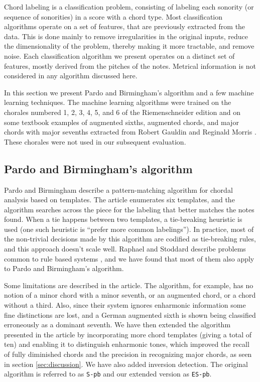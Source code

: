 \documentclass{article}
\begin{document}
Chord labeling is a classification problem, consisting of labeling
each sonority (or sequence of sonorities) in a score with a chord
type. Most classification algorithms operate on a set of features,
that are previously extracted from the data. This is done mainly to
remove irregularities in the original inputs, reduce the
dimensionality of the problem, thereby making it more tractable, and
remove noise. Each classification algorithm we present operates on a
distinct set of features, mostly derived from the pitches of the
notes. Metrical information is not considered in any algorithm
discussed here.

In this section we present Pardo and Birmingham's algorithm and a few
machine learning techniques. The machine learning algorithms were
trained on the chorales numbered 1, 2, 3, 4, 5, and 6 of the
Riemenschneider edition and on some textbook examples of augmented
sixths, augmented chords, and major chords with major sevenths
extracted from Robert Gauldin \cite{gauldin05:harmonic} and Reginald
Morris \cite{morris33:figured}. These chorales were not used in our
subsequent evaluation.

\subsection{Pardo and Birmingham's algorithm}
\label{sec:pardo}


Pardo and Birmingham \cite{barthelemy.ea01:figured} describe a
pattern-matching algorithm for chordal analysis based on templates.
The article enumerates six templates, and the algorithm searches
across the piece for the labeling that better matches the notes found.
When a tie happens between two templates, a tie-breaking heuristic is
used (one such heuristic is ``prefer more common labelings''). In
practice, most of the non-trivial decisions made by this algorithm are
codified as tie-breaking rules, and this approach doesn't scale
well. Raphael and Stoddard describe problems common to rule based
systems \cite{raphael.ea03:harmonic}, and we have found that most of
them also apply to Pardo and Birmingham's algorithm.

Some limitations are described in the article. The algorithm, for
example, has no notion of a minor chord with a minor seventh, or an
augmented chord, or a chord without a third. Also, since their system
ignores enharmonic information some fine distinctions are lost, and a
German augmented sixth is shown being classified erroneously as a
dominant seventh. We have then extended the algorithm presented in the
article by incorporating more chord templates (giving a total of ten)
and enabling it to distinguish enharmonic tones, which improved the
recall of fully diminished chords and the precision in recognizing
major chords, as seen in section \ref{sec:discussion}. We have also
added inversion detection. The original algorithm is referred to as
\texttt{S-pb} and our extended version as \texttt{ES-pb}.
\end{document}
